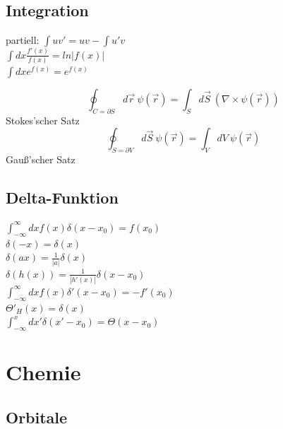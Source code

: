 \documentclass[12pt,a4paper]{article}
\renewcommand{\=}[1]{\stackrel{#1}{=}}
\theoremstyle{definition}
\theoremstyle{remark}
\begin{document}
\begin{center}
\begin{minipage}[t]{.49\linewidth}
\vspace{0pt}
\subsection{Integration}
partiell: $\int uv' = uv - \int u'v$\\
$\int dx \frac{f'(x)}{f(x)} = ln|f(x)|$\\
$\int dx e^{f(x)} = e^{f(x)}$

\begin{framed}
$$\oint_{C = \partial S} d\vec{r} ~ \psi(\vec{r}) = \int_{S} d\vec{S} ~ (\nabla \times \psi(\vec{r}))$$
\centering Stokes'scher Satz
$$\oint_{S = \partial V} d\vec{S} ~ \psi(\vec{r}) = \int_V dV ~ \psi(\vec{r})$$
\centering Gauß'scher Satz
\end{framed}

\end{minipage}%
\hspace{0.01\linewidth}
\begin{minipage}[t]{.49\linewidth}
\vspace{0pt}

\subsection{Delta-Funktion}
$\int_{-\infty}^{\infty} dx f(x) \delta(x-x_0) = f(x_0)$\\
$\delta(-x) = \delta(x)$\\
$\delta(ax) = \frac{1}{|a|} \delta(x)$\\
$\delta(h(x)) = \frac{1}{|h'(x)|} \delta(x-x_0)$\\
$\int_{-\infty}^{\infty} dx f(x) \delta'(x-x_0) = -f'(x_0)$\\
$\Theta'_H(x) = \delta(x)$\\
$\int_{-\infty}^{x} dx' \delta(x'-x_0) = \Theta(x-x_0)$\\

\end{minipage}
\end{center}



\newpage
\section{Chemie}

\subsection{Orbitale}
\end{document}
